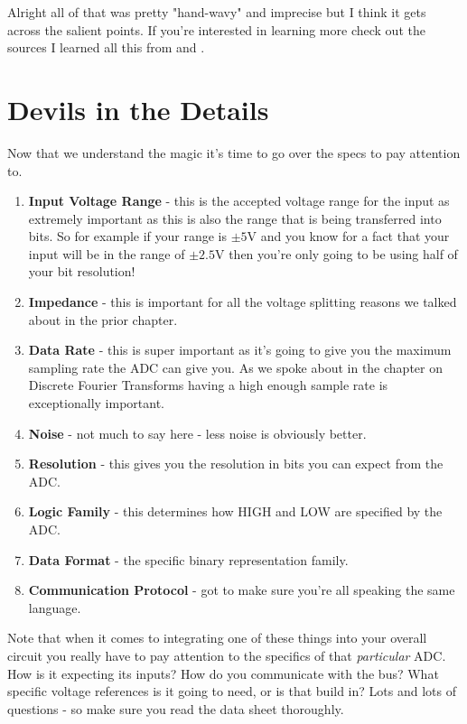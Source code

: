 \documentclass[10pt,a5paper]{book}
\begin{document}
Alright all of that was pretty "hand-wavy" and imprecise but I think it gets across the salient points. If you're interested in learning more check out the sources I learned all this from \cite{fzigunov} and \cite{tinstruments}. 

\section{Devils in the Details}
Now that we understand the magic it's time to go over the specs to pay attention to. 

\begin{enumerate}
\item \textbf{Input Voltage Range} - this is the accepted voltage range for the input as extremely important as this is also the range that is being transferred into bits. So for example if your range is $\pm5$V and you know for a fact that your input will be in the range of $\pm2.5$V then you're only going to be using half of your bit resolution! 
\item \textbf{Impedance} - this is important for all the voltage splitting reasons we talked about in the prior chapter. 
\item \textbf{Data Rate} - this is super important as it's going to give you the maximum sampling rate the ADC can give you. As we spoke about in the chapter on Discrete Fourier Transforms having a high enough sample rate is exceptionally important.
\item \textbf{Noise} - not much to say here - less noise is obviously better.
\item \textbf{Resolution} - this gives you the resolution in bits you can expect from the ADC.
\item \textbf{Logic Family} - this determines how HIGH and LOW are specified by the ADC.
\item \textbf{Data Format} - the specific binary representation family.
\item \textbf{Communication Protocol} - got to make sure you're all speaking the same language.
\end{enumerate}

Note that when it comes to integrating one of these things into your overall circuit you really have to pay attention to the specifics of that \textit{particular} ADC. How is it expecting its inputs? How do you communicate with the bus? What specific voltage references is it going to need, or is that build in? Lots and lots of questions - so make sure you read the data sheet thoroughly. 
\end{document}
